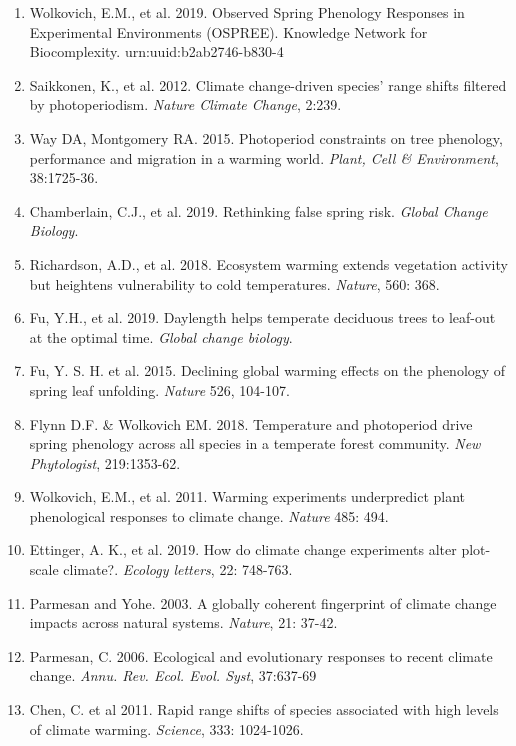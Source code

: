 \documentclass[10.5pt,a4paper]{letter}
\begin{document}
\begin{letter}{}
\begin{footnotesize}
\begin{enumerate}
\item Wolkovich, E.M.,  et al. 2019. Observed Spring Phenology Responses in Experimental Environments (OSPREE). Knowledge Network for Biocomplexity. urn:uuid:b2ab2746-b830-4
\item Saikkonen, K., et al. 2012. Climate change-driven species' range shifts filtered by photoperiodism. \emph{Nature Climate Change}, 2:239.
\item Way DA, Montgomery RA. 2015. Photoperiod constraints on tree phenology, performance and migration in a warming world. \emph{Plant, Cell \& Environment}, 38:1725-36.
\item Chamberlain, C.J., et al. 2019. Rethinking false spring risk.  \emph{Global Change Biology}.
\item Richardson, A.D., et al. 2018. Ecosystem warming extends vegetation activity but heightens vulnerability to cold temperatures. \emph{Nature}, 560: 368.
\item Fu, Y.H., et al. 2019. Daylength helps temperate deciduous trees to leaf-out at the optimal time. \emph{Global change biology}.
\item Fu, Y. S. H. et al. 2015. Declining global warming effects on the phenology of spring leaf unfolding. \emph{Nature} 526, 104-107.
\item Flynn D.F. \& Wolkovich EM. 2018. Temperature and photoperiod drive spring phenology across all species in a temperate forest community. \emph{New Phytologist}, 219:1353-62.
\item Wolkovich, E.M.,  et al. 2011. Warming experiments underpredict plant phenological responses to climate change. \emph{Nature} 485: 494.
\item Ettinger, A. K., et al. 2019. How do climate change experiments alter plot-scale climate?. \emph{Ecology letters}, 22: 748-763.
\item Parmesan and Yohe. 2003. A globally coherent fingerprint of climate change impacts across natural systems. \emph{Nature}, 21: 37-42.
\item Parmesan, C. 2006. Ecological and evolutionary responses to recent climate change. \emph{Annu. Rev. Ecol. Evol. Syst}, 37:637-69
\item Chen, C. et al 2011. Rapid range shifts of species associated with high levels of climate warming. \emph{Science}, 333: 1024-1026.
 \end{enumerate}
\end{footnotesize}

\end{letter}
\end{document}
